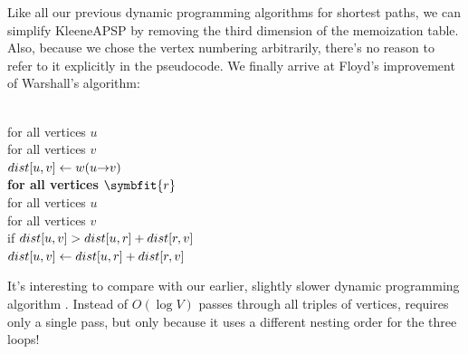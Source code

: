 Like all our previous dynamic programming algorithms for shortest paths, we can simplify KleeneAPSP by removing the third dimension of the memoization table.
Also, because we chose the vertex numbering arbitrarily, there’s no reason to refer to it explicitly in the pseudocode.
We finally arrive at Floyd’s improvement of Warshall’s algorithm:

\begin{pseudocode}
\\
for all vertices $u$\\
\Indent for all vertices $v$\\
\Indent\Indent $dist[u, v] \gets w(u\mathord{\rightarrow}v)$\\
{\color{JEred}\bfseries for all vertices $\symbfit{r}$}\\
\Indent for all vertices $u$\\
\Indent\Indent for all vertices $v$\\
\Indent\Indent\Indent if $dist[u, v] > dist[u, r] + dist[r, v]$\\
\Indent\Indent\Indent\Indent $dist[u, v] \gets dist[u, r] + dist[r, v]$
\end{pseudocode}

It’s interesting to compare  with our earlier, slightly slower dynamic programming algorithm .
Instead of $O(\log V)$ passes through all triples of vertices,  requires only a single pass, but only because it uses a different nesting order for the three loops!

